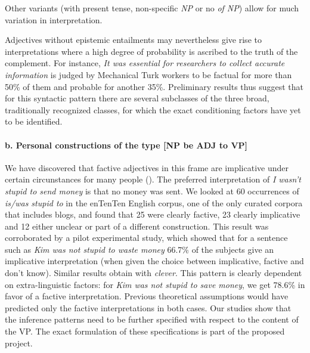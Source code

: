 \documentclass[10pt]{article}
\begin{document}
\vspace{-0.5em}
\vspace{-0.5em}

\noindent
Other variants (with present tense, non-specific \textit{NP} or no \textit{of NP}) allow for much variation in interpretation.

Adjectives without epistemic entailments may nevertheless give rise to interpretations where a high degree of probability is ascribed to the truth of the complement. For instance, \textit{It was essential for researchers to collect accurate information} is judged by Mechanical Turk workers to be factual for more than 50\% of them and probable for another 35\%. 
Preliminary results thus suggest that for this syntactic pattern there are several subclasses of the three broad, traditionally recognized classes, for which the exact conditioning factors have yet to be identified.

\vspace{-1.0em}
\paragraph{b. Personal constructions of the type [NP be ADJ to VP]}
We have discovered that factive adjectives in this frame are implicative under certain circunstances for many people (\cite{csli-gang-cssp13}). 
The preferred interpretation of \textit{I wasn't stupid to send money} is that no money was sent. We looked at 60 occurrences of \textit{is/was stupid to} in the enTenTen English corpus, one of the only curated corpora that includes blogs, and found that 25 were clearly factive, 23 clearly implicative and 12 either unclear or part of a different construction. This result was corroborated by a pilot experimental study, which showed that for a sentence such as \textit{Kim was not stupid to waste money} 66.7\% of the subjects give an implicative interpretation (when given the choice between implicative, factive and don't know). Similar results obtain with \textit{clever}.
This pattern is clearly dependent on extra-linguistic factors: for \textit{Kim was not stupid to save money}, we get 78.6\% in favor of a factive interpretation. Previous theoretical assumptions would have predicted only the factive interpretations in both cases. Our studies show that the inference patterns need to be further specified with respect to the content of the VP. The exact formulation
of these specifications is part of the proposed project.
\end{document}

